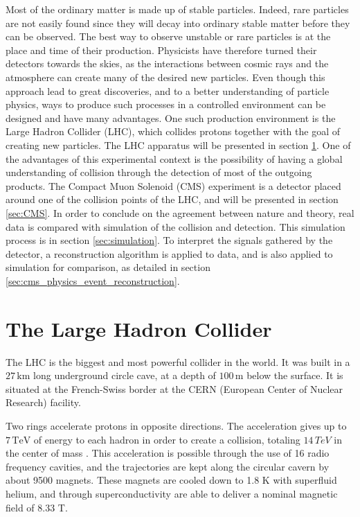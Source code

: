 
Most of the ordinary matter is made up of stable particles. Indeed, rare particles are not easily found since they will decay into ordinary stable matter before they can be observed. The best way to observe unstable or rare particles is at the place and time of their production. Physicists have therefore turned their detectors towards the skies, as the interactions between cosmic rays and the atmosphere can create many of the desired new particles. Even though this approach lead to great discoveries, and to a better understanding of particle physics, ways to produce such processes in a controlled environment can be designed and have many advantages. One such production environment is the Large Hadron Collider (LHC), which collides protons together with the goal of creating new particles. The LHC apparatus will be presented in section \ref{sec:LHC}. One of the advantages of this experimental context is the possibility of having a global understanding of collision through the detection of most of the outgoing products. The Compact Muon Solenoid (CMS) experiment is a detector placed around one of the collision points of the LHC, and will be presented in section \ref{sec:CMS}. In order to conclude on the agreement between nature and theory, real data is compared with simulation of the collision and detection. This simulation process is in section \ref{sec:simulation}. To interpret the signals gathered by the detector, a reconstruction algorithm is applied to data, and is also applied to simulation for comparison, as detailed in section \ref{sec:cms_physics_event_reconstruction}.

\section{The Large Hadron Collider}
\label{sec:LHC}

The LHC is the biggest and most powerful collider in the world. It was built in a $27\,\mathrm{km}$ long underground circle cave, at a depth of $100\,\mathrm{m}$ below the surface. It is situated at the French-Swiss border at the CERN (European Center of Nuclear Research) facility.

Two rings accelerate protons in opposite directions. The acceleration gives up to $7\,\mathrm{TeV}$ of energy to each hadron in order to create a collision, totaling $14\,TeV$ in the center of mass \cite{Bruning:782076,Bruning:815187,Benedikt:823808}. This acceleration is possible through the use of 16 radio frequency cavities, and the trajectories are kept along the circular cavern by about 9500 magnets. These magnets are cooled down to 1.8 K with superfluid helium, and through superconductivity are able to deliver a nominal magnetic field of 8.33 T.

